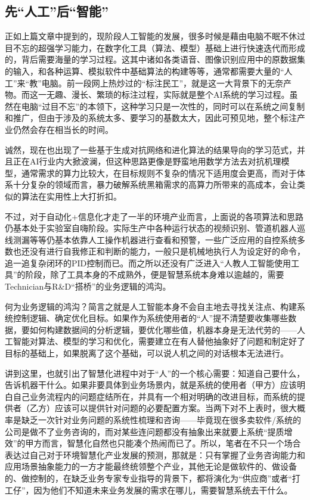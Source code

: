 \documentclass[]{book}
\begin{document}
\hypertarget{ux5148ux4ebaux5de5ux540eux667aux80fd}{%
\subsection{先``人工''后``智能''}\label{ux5148ux4ebaux5de5ux540eux667aux80fd}}

正如上篇文章中提到的，现阶段人工智能的发展，很多时候是藉由电脑不眠不休过目不忘的超强学习能力，在数字化工具（算法、模型）基础上进行快速迭代而形成的，背后需要海量的学习过程。这其中诸如各类语音、图像识别应用中的原数据集的输入，和各种运算、模拟软件中基础算法的构建等等，通常都需要大量的``人工''来``教''电脑。前一段网上热炒过的``标注民工''，就是这一大背景下的无奈产物。而这一无趣、漫长、繁琐的标注过程，实际就是整个AI系统的学习过程。虽然在电脑``过目不忘''的本领下，这种学习只是一次性的，同时可以在系统之间复制和推广，但由于涉及的系统太多、要学习的基数太大，因此可预见地，整个标注产业仍然会存在相当长的时间。

诚然，现在也出现了一些基于生成对抗网络和进化算法的结果导向的学习范式，并且正在AI行业内大掀波澜，但这种思路更像是野蛮地用数学方法去对抗机理模型，通常需求的算力比较大，在目标规则不复杂的情况下适用度会更高，而对于体系十分复杂的领域而言，暴力破解系统黑箱需求的高算力所带来的高成本，会让类似的算法在实用性上大打折扣。

不过，对于自动化+信息化才走了一半的环境产业而言，上面说的各项算法和思路仍基本处于实验室自嗨阶段。实际生产中各种运行状态的视频识别、管道机器人巡线测漏等等仍基本依靠人工操作机器进行查看和预警，一些广泛应用的自控系统多数也还没有进行自我修正和判断的能力，一般只是机械地执行人为设定好的命令，追一追复杂闭环的PID控制而已。而之所以还没有广泛进入``人教人工智能使用工具''的阶段，除了工具本身的不成熟外，便是智慧系统本身难以逾越的，需要Technician与R\&D``搭桥''的业务逻辑的鸿沟。

何为业务逻辑的鸿沟？简言之就是人工智能本身不会自主地去寻找关注点、构建系统控制逻辑、确定优化目标。如果作为系统使用者的``人''提不清楚要收集哪些数据，要如何构建数据间的分析逻辑，要优化哪些值，机器本身是无法代劳的------人工智能对算法、模型的学习和优化，需要建立在有人替他抽象好了问题和制定好了目标的基础上，如果脱离了这个基础，可以说人机之间的对话根本无法进行。

讲到这里，也就引出了智慧化进程中对于``人''的一个核心需要：知道自己要什么，告诉机器干什么。如果非要具体到业务场景内，就是系统的使用者（甲方）应该明白自己业务流程内的问题症结所在，并具有一个相对明确的改进目标，而系统的提供者（乙方）应该可以提供针对问题的必要配置方案。当两下对不上表时，很大概率是缺乏一次针对业务问题的系统性梳理和咨询------毕竟现在很多卖软件/系统的公司是做不了业务咨询的，而对某些连问题都没有抽象出来就要上系统``提质增效''的甲方而言，智慧化自然也只能凑个热闹而已了。所以，笔者在不只一个场合表达过自己对于环境智慧化产业发展的预测，那就是：只有掌握了业务咨询能力和应用场景抽象能力的一方才能最终统领整个产业，其他无论是做软件的、做设备的、做控制的，在缺乏业务专家专业指导的背景下，都将演化为``供应商''或者``打工仔''，因为他们不知道未来业务发展的需求在哪儿，需要智慧系统去干什么。
\end{document}
